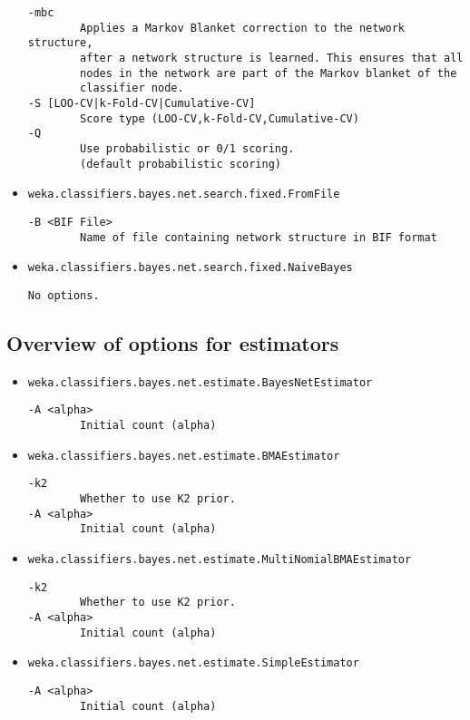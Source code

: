 \begin{itemize}
  \begin{verbatim}
-mbc
        Applies a Markov Blanket correction to the network structure,
        after a network structure is learned. This ensures that all
        nodes in the network are part of the Markov blanket of the
        classifier node.
-S [LOO-CV|k-Fold-CV|Cumulative-CV]
        Score type (LOO-CV,k-Fold-CV,Cumulative-CV)
-Q
        Use probabilistic or 0/1 scoring.
        (default probabilistic scoring)
  \end{verbatim}
\item \texttt{weka.classifiers.bayes.net.search.fixed.FromFile}
  \begin{verbatim}
-B <BIF File>
        Name of file containing network structure in BIF format
  \end{verbatim}
\item \texttt{weka.classifiers.bayes.net.search.fixed.NaiveBayes}
  \begin{verbatim}
No options.
  \end{verbatim}
\end{itemize}

\subsection*{Overview of options for estimators}

\begin{itemize}
\item \texttt{weka.classifiers.bayes.net.estimate.BayesNetEstimator}
  \begin{verbatim}
-A <alpha>
        Initial count (alpha)
  \end{verbatim}
\item \texttt{weka.classifiers.bayes.net.estimate.BMAEstimator}
  \begin{verbatim}
-k2
        Whether to use K2 prior.
-A <alpha>
        Initial count (alpha)
  \end{verbatim}
\item \texttt{weka.classifiers.bayes.net.estimate.MultiNomialBMAEstimator}
  \begin{verbatim}
-k2
        Whether to use K2 prior.
-A <alpha>
        Initial count (alpha)
  \end{verbatim}
\item \texttt{weka.classifiers.bayes.net.estimate.SimpleEstimator}
  \begin{verbatim}
-A <alpha>
        Initial count (alpha)
  \end{verbatim}
\end{itemize}

